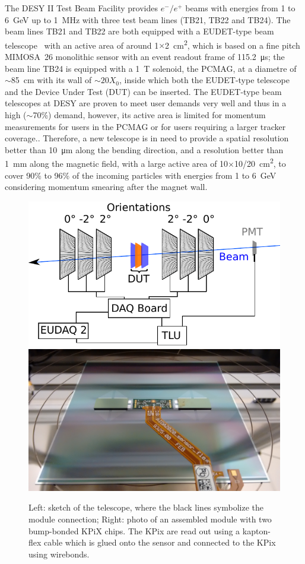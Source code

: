 The DESY II Test Beam Facility\cite{desytbf} provides $e^-/e^+$ beams with energies from 1 to \SI{6}{\GeV} up to \SI{1}{\MHz}
with three test beam lines (TB21, TB22 and TB24).
The beam lines TB21 and TB22 are both equipped with a EUDET-type beam telescope~\cite{eudet} with an active area of around 1$\times$\SI{2}{\square\centi\metre},
which is based on a fine pitch \uppercase{mimosa}~26 monolithic sensor with an event readout frame of \SI{115.2}{\micro\second};
the beam line TB24 is equipped with a \SI{1}{\tesla} solenoid, the PCMAG, at a diametre of $\sim$\SI{85}{\centi\metre} with its wall of $\sim20X_0$,
inside which both the EUDET-type telescope and the Device Under Test (DUT) can be inserted.
The EUDET-type beam telescopes at DESY are proven to meet user demands very well and thus in a high ($\sim$70\%) demand,
however, its active area is limited for momentum measurements for users in the PCMAG or for users requiring a larger tracker coverage..
Therefore, a new telescope is in need to provide a spatial resolution better than \SI{10}{\micro\metre} along the bending direction,
and a resolution better than \SI{1}{\milli\metre} along the magnetic field,
with a large active area of 10$\times$10/\SI{20}{\square\centi\metre},
to cover 90\% to 96\% of the incoming particles with energies from 1 to \SI{6}{\GeV} considering momentum smearing after the magnet wall.

\begin{figure}[!ht]%
\centering
\includegraphics[width=0.49\linewidth]{pics/principle.pdf}
\includegraphics[width=0.49\linewidth]{pics/sensor_module1.jpg}
\caption{Left: sketch of the \lycoris telescope, where the black lines symbolize the module connection;
Right: photo of an assembled module with two bump-bonded KPiX chips. The KPix are read out using a kapton-flex cable which is glued onto the sensor and connected to the KPix using wirebonds.}%
\label{fig:1figs}%
\end{figure}

